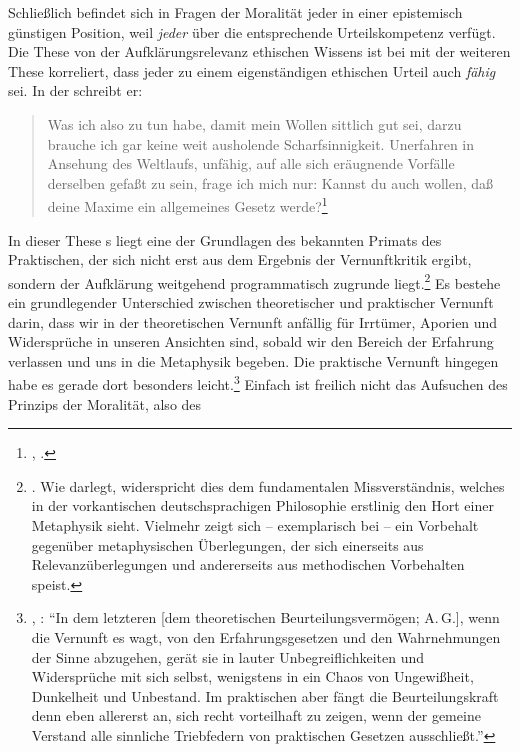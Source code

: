 \label{Abschnitt:moralischepistemischerOptimismus}
Schließlich befindet sich in Fragen der Moralität jeder in einer
epistemisch günstigen Position, weil \emph{jeder} über die entsprechende
Urteilskompetenz verfügt. Die These von der Aufklärungsrelevanz
ethischen Wissens ist bei  mit der weiteren These korreliert, dass
jeder zu einem eigenständigen ethischen Urteil auch \emph{fähig} sei. In der
 schreibt er:
\begin{quote}
  Was ich also zu tun habe, damit mein Wollen sittlich gut sei, darzu brauche
  ich gar keine weit ausholende Scharfsinnigkeit. Unerfahren in Ansehung des
  Weltlaufs, unfähig, auf alle sich eräugnende Vorfälle derselben gefaßt zu
  sein, frage ich mich nur: Kannst du auch wollen, daß deine Maxime ein
  allgemeines Gesetz
  werde?\footnote{\cite[BA 19--20]{Kant:GrundlegungzurMetaphysikderSitten1965},
  \cite[IV: 403.18--22]{Kant:GesammelteWerke1900ff.}.}
\end{quote}
In dieser These s liegt eine der Grundlagen des bekannten Primats des
Praktischen, der sich nicht erst aus dem Ergebnis der Vernunftkritik ergibt, sondern der Aufklärung weitgehend
programmatisch zugrunde
liegt.\footnote{\cite[Vgl.][127--130]{Ciafardone:UeberdasPrimatderpraktischenVernunftvordertheoretischenbeiThomasiusundCrusiusmitBeziehungaufKant1982}.
Wie  darlegt, widerspricht dies dem fundamentalen
Missverständnis, welches in der vorkantischen deutschsprachigen
Philosophie erstlinig den Hort einer  Metaphysik
sieht. Vielmehr zeigt sich -- exemplarisch bei  -- ein Vorbehalt
gegenüber metaphysischen Überlegungen, der sich einerseits aus
Relevanzüberlegungen und andererseits aus methodischen Vorbehalten speist.}
Es bestehe ein grundlegender Unterschied zwischen theoretischer und praktischer
Vernunft darin, dass wir in der theoretischen Vernunft anfällig für Irrtümer,
Aporien und Widersprüche in unseren Ansichten sind, sobald wir den Bereich der
Erfahrung verlassen und uns in die Metaphysik begeben. Die praktische Vernunft
hingegen habe es gerade dort besonders
leicht.\footnote{\cite[Vgl.][BA 21]{Kant:GrundlegungzurMetaphysikderSitten1965},
\cite[IV: 404.13--19]{Kant:GesammelteWerke1900ff.}: \enquote{In dem letzteren
[dem theoretischen Beurteilungsvermögen; A.\,G.], wenn die Vernunft es wagt, von
den Erfahrungsgesetzen und den Wahrnehmungen der Sinne abzugehen, gerät sie in
lauter Unbegreiflichkeiten und Widersprüche mit sich selbst, wenigstens in ein
Chaos von Ungewißheit, Dunkelheit und Unbestand. Im praktischen aber fängt die
Beurteilungskraft denn eben allererst an, sich recht vorteilhaft zu zeigen, wenn
der gemeine Verstand alle sinnliche Triebfedern von praktischen Gesetzen
ausschließt.}} Einfach ist freilich nicht das Aufsuchen des Prinzips der Moralität, also des
